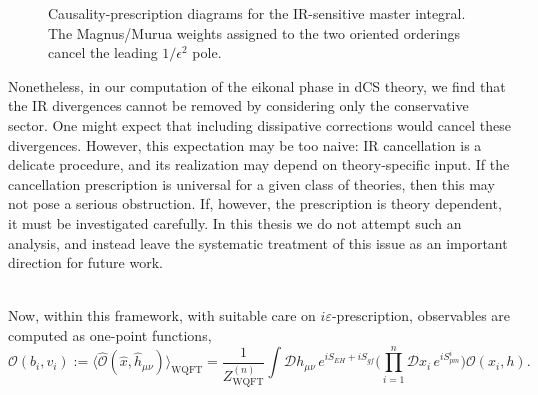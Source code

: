 {\begin{figure}[htb!]
\caption{Causality-prescription diagrams for the IR-sensitive master integral. The Magnus/Murua weights assigned to the two oriented orderings cancel the leading \(1/\epsilon^2\) pole.}
\label{fig:eikonal-ir-causality}
\end{figure}
Nonetheless, in our computation of the eikonal phase in dCS theory, we find that the IR divergences cannot be removed by considering only the conservative sector. One might expect that including dissipative corrections would cancel these divergences. However, this expectation may be too naive: IR cancellation is a delicate procedure, and its realization may depend on theory-specific input. If the cancellation prescription is universal for a given class of theories, then this may not pose a serious obstruction. If, however, the prescription is theory dependent, it must be investigated carefully. In this thesis we do not attempt such an analysis, and instead leave the systematic treatment of this issue as an important direction for future work.}\\
Now, within this framework, with suitable care on $i\varepsilon$-prescription, observables are computed as one-point functions,
\begin{equation}
      \mathcal{O}(b_i,v_i)
      :=
      \langle\hat{\mathcal O}(\hat x,\hat h_{\mu\nu})\rangle_{\textrm{WQFT}}
      =
      \frac{1}{Z^{(n)}_{\textrm{WQFT}}}
      \int \mathcal{D}h_{\mu\nu}\,
      e^{iS_{EH}+iS_{gf}}
      \Big(\prod_{i=1}^{n}\mathcal{D}x_i\,e^{iS_{pm}^i}\Big)
      \mathcal O(x_i,h).
\end{equation}
